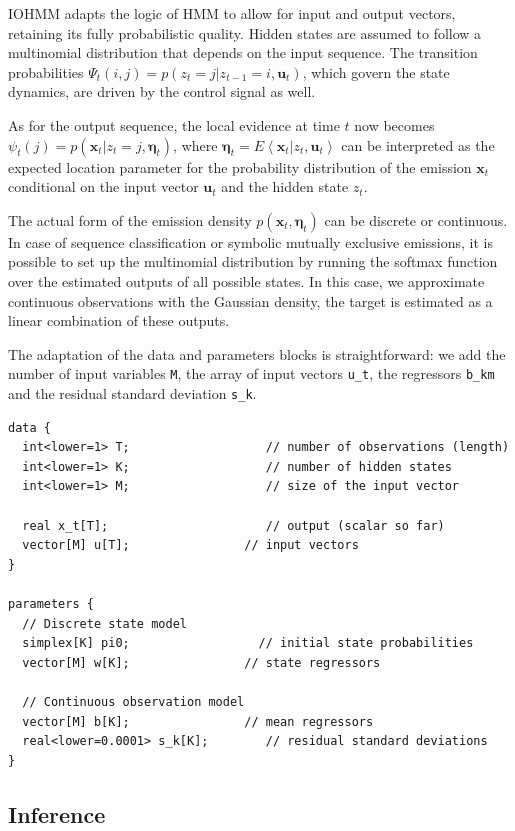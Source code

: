 \documentclass[]{article}
\newcommand\ev[1]{E\left\langle#1\right\rangle}
\newcommand{\mat}[1]{\mathbf{#1}}
\begin{document}
{{{IOHMM adapts the logic of HMM to allow for input and output vectors,
retaining its fully probabilistic quality. Hidden states are assumed to
follow a multinomial distribution that depends on the input sequence.
The transition probabilities
\(\Psi_t(i, j) = p(z_t = j | z_{t-1} = i, \mat{u}_{t})\), which govern
the state dynamics, are driven by the control signal as well.

As for the output sequence, the local evidence at time \(t\) now becomes
\(\psi_t(j) = p(\mat{x}_t | z_t = j, \mat{\eta}_t)\), where
\(\mat{\eta}_t = \ev{\mat{x}_t | z_t, \mat{u}_t}\) can be interpreted as
the expected location parameter for the probability distribution of the
emission \(\mat{x}_{t}\) conditional on the input vector \(\mat{u}_t\)
and the hidden state \(z_t\).

The actual form of the emission density \(p(\mat{x}_t, \mat{\eta}_t)\)
can be discrete or continuous. In case of sequence classification or
symbolic mutually exclusive emissions, it is possible to set up the
multinomial distribution by running the softmax function over the
estimated outputs of all possible states. In this case, we approximate
continuous observations with the Gaussian density, the target is
estimated as a linear combination of these outputs.

The adaptation of the data and parameters blocks is straightforward: we
add the number of input variables \texttt{M}, the array of input vectors
\texttt{u\_t}, the regressors \texttt{b\_km} and the residual standard
deviation \texttt{s\_k}.

\begin{verbatim}
data {
  int<lower=1> T;                   // number of observations (length)
  int<lower=1> K;                   // number of hidden states
  int<lower=1> M;                   // size of the input vector

  real x_t[T];                      // output (scalar so far)
  vector[M] u[T];                // input vectors
}

parameters {
  // Discrete state model
  simplex[K] pi0;                  // initial state probabilities
  vector[M] w[K];                // state regressors

  // Continuous observation model
  vector[M] b[K];                // mean regressors
  real<lower=0.0001> s_k[K];        // residual standard deviations
}
\end{verbatim}

\subsection{Inference}\label{inference-1}

}}}
\end{document}
